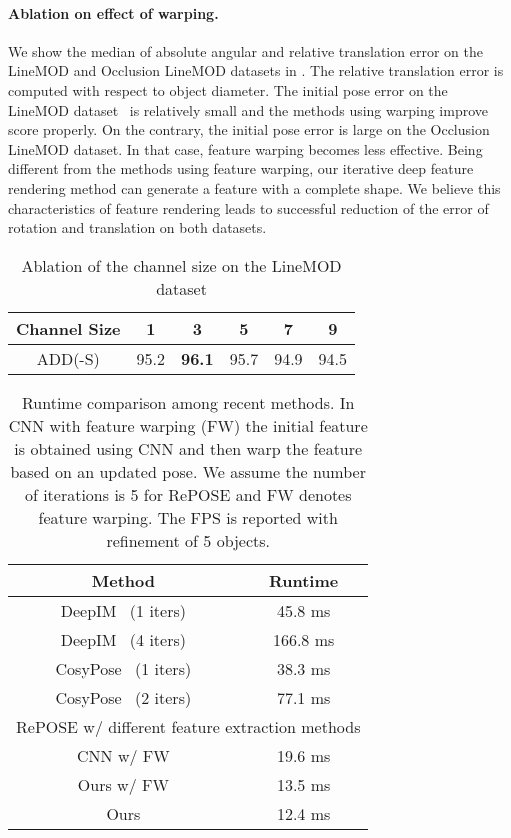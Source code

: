 \documentclass[10pt,twocolumn,letterpaper]{article}
\begin{document}
\paragraph{Ablation on effect of warping.}
We show the median of absolute angular and relative translation error on the LineMOD and Occlusion LineMOD datasets in .
The relative translation error is computed with respect to object diameter.
The initial pose error on the LineMOD dataset~\cite{linemod} is relatively small and the methods using warping improve score properly.
On the contrary, the initial pose error is large on the Occlusion LineMOD dataset.
In that case, feature warping becomes less effective.
Being different from the methods using feature warping, our iterative deep feature rendering method can generate a feature with a complete shape.
We believe this characteristics of feature rendering leads to successful reduction of the error of rotation and translation on both datasets.

\begin{table}[t]
    \centering
    \caption{Ablation of the channel size on the LineMOD dataset}
    \begin{tabular}{c|ccccc}
        \hline
        Channel Size & 1 & 3 & 5 & 7 & 9 \\ \hline
        ADD(-S) & 95.2 & \textbf{96.1} & 95.7 & 94.9 & 94.5 \\ \hline
    \end{tabular}
    \label{tab:ab_ch}
\end{table}


\begin{table}[t]
 \centering
 \caption{Runtime comparison among recent methods. In CNN with feature warping (FW) the initial feature is obtained using CNN and then warp the feature based on an updated pose. We assume the number of iterations is 5 for RePOSE and FW denotes feature warping. The FPS is reported with refinement of 5 objects.}
 \vspace{0.2cm}
 \label{tab:comp_strat}
 \begin{tabular}{|c||c|}
   \hline
   Method & Runtime \\ \hline
   DeepIM~\cite{li2018deepim} (1 iters) & 45.8 ms          \\
   DeepIM~\cite{li2018deepim} (4 iters) & 166.8 ms          \\
   CosyPose~\cite{labbe2020} (1 iters) & 38.3 ms          \\
   CosyPose~\cite{labbe2020} (2 iters) & 77.1 ms          \\ \hline
   \multicolumn{2}{|c|}{RePOSE w/ different feature extraction methods}           \\ \hline
   CNN w/ FW   & 19.6 ms         \\
   Ours w/ FW    & 13.5 ms         \\
   Ours & 12.4 ms \\ \hline
 \end{tabular}
\end{table}
\end{document}
